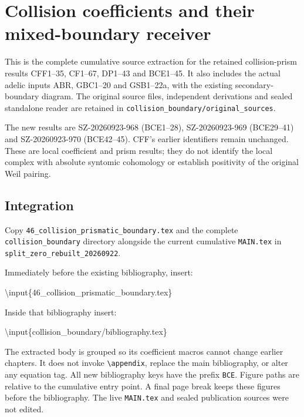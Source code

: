 \documentclass[
]{article}
\author{}
\date{}
\newenvironment{Shaded}{}{}
\newcommand{\FunctionTok}[1]{\textcolor[rgb]{0.02,0.16,0.49}{#1}}
\newcommand{\NormalTok}[1]{#1}
\begin{document}
\section{Collision coefficients and their mixed-boundary
receiver}\label{collision-coefficients-and-their-mixed-boundary-receiver}

This is the complete cumulative source extraction for the retained
collision-prism results CFF1--35, CF1--67, DP1--43 and BCE1--45. It also
includes the actual adelic inputs ABR, GBC1--20 and GSB1--22a, with the
existing secondary-boundary diagram. The original source files,
independent derivations and sealed standalone reader are retained in
\texttt{collision\_boundary/original\_sources}.

The new results are SZ-20260923-968 (BCE1--28), SZ-20260923-969
(BCE29--41) and SZ-20260923-970 (BCE42--45). CFF's earlier identifiers
remain unchanged. These are local coefficient and prism results; they do
not identify the local complex with absolute syntomic cohomology or
establish positivity of the original Weil pairing.

\subsection{Integration}\label{integration}

Copy \texttt{46\_collision\_prismatic\_boundary.tex} and the complete
\texttt{collision\_boundary} directory alongside the current cumulative
\texttt{MAIN.tex} in \texttt{split\_zero\_rebuilt\_20260922}.

Immediately before the existing bibliography, insert:

\begin{Shaded}
\begin{Highlighting}[]
\FunctionTok{\textbackslash{}input}\NormalTok{\{46\_collision\_prismatic\_boundary.tex\}}
\end{Highlighting}
\end{Shaded}

Inside that bibliography insert:

\begin{Shaded}
\begin{Highlighting}[]
\FunctionTok{\textbackslash{}input}\NormalTok{\{collision\_boundary/bibliography.tex\}}
\end{Highlighting}
\end{Shaded}

The extracted body is grouped so its coefficient macros cannot change
earlier chapters. It does not invoke \texttt{\textbackslash{}appendix},
replace the main bibliography, or alter any equation tag. All new
bibliography keys have the prefix \texttt{BCE}. Figure paths are
relative to the cumulative entry point. A final page break keeps these
figures before the bibliography. The live \texttt{MAIN.tex} and sealed
publication sources were not edited.
\end{document}
